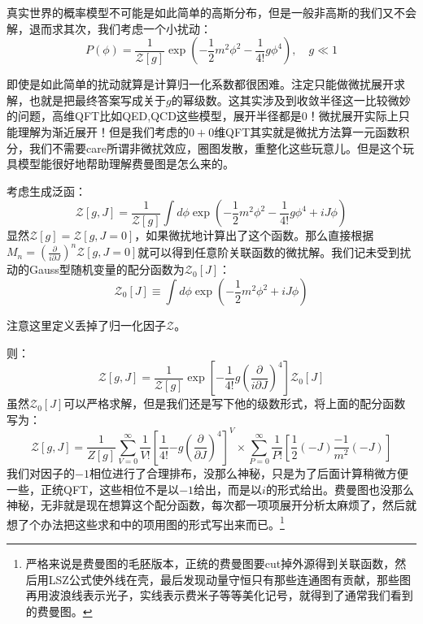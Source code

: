 真实世界的概率模型不可能是如此简单的高斯分布，但是一般非高斯的我们又不会解，退而求其次，我们考虑一个小扰动：
\begin{equation}
	P(\phi)=\frac1{\mathcal{Z}[g]}\exp(-\frac12m^2\phi^2-\frac1{4!}g\phi^4),\quad g\ll 1
\end{equation}

即使是如此简单的扰动就算是计算归一化系数都很困难。注定只能做微扰展开求解，也就是把最终答案写成关于$g$的幂级数。这其实涉及到收敛半径这一比较微妙的问题，高维QFT比如QED,QCD这些模型，展开半径都是0！微扰展开实际上只能理解为渐近展开！但是我们考虑的$0+0$维QFT其实就是微扰方法算一元函数积分，我们不需要care所谓非微扰效应，圈图发散，重整化这些玩意儿。但是这个玩具模型能很好地帮助理解费曼图是怎么来的。

考虑生成泛函：
\begin{equation}
	\mathcal{Z}[g,J]=\frac1{\mathcal{Z}[g]}\int d\phi\exp(-\frac12m^2\phi^2-\frac1{4!}g\phi^4+iJ\phi)
\end{equation}
显然$\mathcal{Z}[g]=\mathcal{Z}[g,J=0]$，如果微扰地计算出了这个函数。那么直接根据$M_n=\left(\frac{\partial}{i\partial J}\right)^n\mathcal{Z}[g,J=0]$就可以得到任意阶关联函数的微扰解。我们记未受到扰动的Gauss型随机变量的配分函数为$\mathcal{Z}_0[J]$：
\begin{equation}
	\mathcal{Z}_0[J]\equiv \int d\phi \exp(-\frac{1}{2}m^2\phi^2+iJ\phi)
\end{equation}
\begin{remark}
	注意这里定义丢掉了归一化因子$\mathcal{Z}$。
\end{remark}
则：
\begin{equation}
	\mathcal{Z}[g,J]=\frac{1}{\mathcal{Z}[g]}\exp\left[-\frac1{4!}g\left(\frac{\partial}{i\partial J}\right)^4\right]\mathcal{Z}_0[J]
\end{equation}
虽然$\mathcal{Z}_0[J]$可以严格求解，但是我们还是写下他的级数形式，将上面的配分函数写为：
\begin{equation}
	\mathcal{Z}[g,J]=\frac1{Z[g]}\sum_{V=0}^{\infty}\frac{1}{V!}\left[\frac{1}{4!}{-g}\left(\frac{\partial}{\partial J}\right)^4\right]^V\times \sum_{P=0}^{\infty}\frac{1}{P!}\left[\frac12 (-J)\frac{-1}{m^2}(-J)\right]
\end{equation}
我们对因子的$-1$相位进行了合理排布，没那么神秘，只是为了后面计算稍微方便一些，正统QFT，这些相位不是以$-1$给出，而是以$i$的形式给出。费曼图也没那么神秘，无非就是现在想算这个配分函数，每次都一项项展开分析太麻烦了，然后就想了个办法把这些求和中的项用图的形式写出来而已。\footnote{严格来说是费曼图的毛胚版本，正统的费曼图要cut掉外源得到关联函数，然后用LSZ公式使外线在壳，最后发现动量守恒只有那些连通图有贡献，那些图再用波浪线表示光子，实线表示费米子等等美化记号，就得到了通常我们看到的费曼图。}

